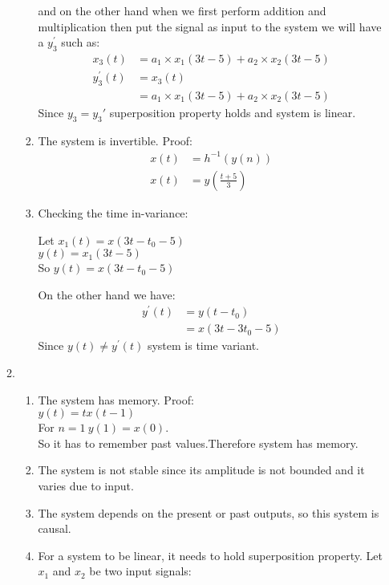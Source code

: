 \documentclass[10pt,a4paper, margin=1in]{article}
\begin{document}
\begin{enumerate}
\begin{enumerate}
\begin{enumerate}
            and on the other hand when we first perform addition and multiplication then put the signal as input to the system we will have a $y_3^{'}$ such as:
            \begin{align*}
                x_3(t)&=a_1\times x_1(3t-5) + a_2\times x_2(3t-5) \\
                y_3^{'}(t)&= x_3(t)\\
                &=a_1\times x_1(3t-5) + a_2\times x_2(3t-5)
            \end{align*}
            Since $y_3 = y_3'$ superposition property holds and system is linear.
        \item The system is invertible. Proof:
        \begin{align*}
        x(t) &= h^{-1}(y(n)) \\
        x(t) &= y(\frac{t+5}{3})
        \end{align*}
         \item Checking the time in-variance:
        \begin{center}
        Let $x_1(t) = x(3t-t_0-5)$ \\
         $y(t)= x_1(3t-5)$ \\
        So $y(t) = x(3t - t_0-5)$
        \end{center}
        On the other hand we have:
        \begin{align*}
        y^{'}(t) &= y(t-t_0) \\
        &= x(3t-3t_0-5)
        \end{align*}
        Since $y(t) \neq y^{'}(t)$ system is time variant. \\
        \end{enumerate}
    \item %
    \begin{enumerate}
        \item The system has memory. Proof:\\
        \(y(t)=tx(t-1)\)\\
        For \(n=1\ y(1)=x(0)\).\\ So it has to remember past values.Therefore system has memory.
        \item The system is not stable since its amplitude is not bounded and it varies due to input.
        \item The system depends on the present or past outputs, so this system is causal.
        \item For a system to be linear, it needs to hold superposition property. Let $x_1$ and $x_2$ be two input signals:

\end{enumerate}
\end{enumerate}
\end{enumerate}
\end{document}
